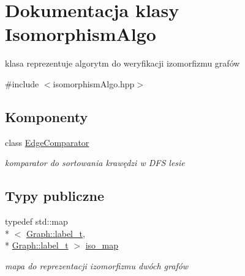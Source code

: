\hypertarget{classIsomorphismAlgo}{\section{Dokumentacja klasy Isomorphism\-Algo}
\label{classIsomorphismAlgo}
}


klasa reprezentuje algorytm do weryfikacji izomorfizmu grafów  




{\ttfamily \#include $<$isomorphism\-Algo.\-hpp$>$}

\subsection*{Komponenty}
\begin{DoxyCompactItemize}
\item 
class \hyperlink{classIsomorphismAlgo_1_1EdgeComparator}{Edge\-Comparator}
\begin{DoxyCompactList}\small\item\em komparator do sortowania krawędzi w D\-F\-S lesie \end{DoxyCompactList}\end{DoxyCompactItemize}
\subsection*{Typy publiczne}
\begin{DoxyCompactItemize}
\item 
typedef std\-::map\\*
$<$ \hyperlink{classGraph_a2237a0ada8484c37b8200c0e3685ca71}{Graph\-::label\-\_\-t}, \\*
\hyperlink{classGraph_a2237a0ada8484c37b8200c0e3685ca71}{Graph\-::label\-\_\-t} $>$ \hyperlink{classIsomorphismAlgo_ad95c1101cd4ef09d4a581d8fbe44aff0}{iso\-\_\-map}
\begin{DoxyCompactList}\small\item\em mapa do reprezentacji izomorfizmu dwóch grafów \end{DoxyCompactList}\end{DoxyCompactItemize}
